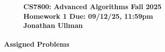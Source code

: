 \documentclass[11pt]{article}
\theoremstyle{definition}
\newcommand{\HWtitle}[2]{\begin{figure}[t!]{\bfseries \Large \color{DarkBlue}  \noindent CS7800: Advanced Algorithms \hfill Fall 2025} \\[0.2em] {\bfseries \Large \color{DarkBlue} Homework #1 \hfill Due: {#2}} \\[1em] {\bfseries \large Jonathan Ullman}\\[1ex] \end{figure}}
\begin{document}

\HWtitle{1}{09/12/25, 11:59pm}


\renewcommand{\labelenumii}{{\bfseries \em \arabic{enumi}.\arabic{enumii}}}
\newcommand{\problemitem}{\renewcommand{\labelenumi}{{\bfseries \em Problem \arabic{enumi}}}\item}
\newcommand{\solutionitem}{\renewcommand{\labelenumi}{{\bfseries \em Solution \arabic{enumi}}}\addtocounter{enumi}{-1}\item}



\paragraph{Assigned Problems}
\end{document}
